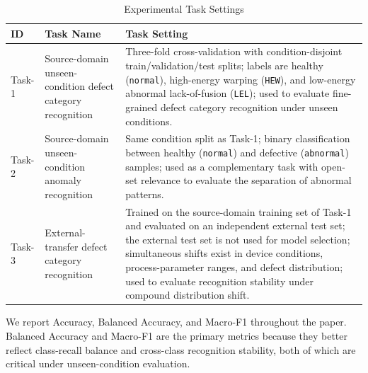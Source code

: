 \documentclass[journal]{IEEEtran}
\begin{document}
\begin{table}[!t]
\centering
\caption{Experimental Task Settings}
\label{tab:task_setup}
\footnotesize
\setlength{\tabcolsep}{4pt}
\begin{tabular*}{\textwidth}{@{\extracolsep{\fill}}>{\raggedright\arraybackslash}p{}>{\raggedright\arraybackslash}p{}>{\raggedright\arraybackslash}p{}@{}}
\toprule
ID & Task Name & Task Setting \\
\midrule
Task-1 & Source-domain unseen-condition defect category recognition & Three-fold cross-validation with condition-disjoint train/validation/test splits; labels are healthy (\texttt{normal}), high-energy warping (\texttt{HEW}), and low-energy abnormal lack-of-fusion (\texttt{LEL}); used to evaluate fine-grained defect category recognition under unseen conditions. \\
Task-2 & Source-domain unseen-condition anomaly recognition & Same condition split as Task-1; binary classification between healthy (\texttt{normal}) and defective (\texttt{abnormal}) samples; used as a complementary task with open-set relevance to evaluate the separation of abnormal patterns. \\
Task-3 & External-transfer defect category recognition & Trained on the source-domain training set of Task-1 and evaluated on an independent external test set; the external test set is not used for model selection; simultaneous shifts exist in device conditions, process-parameter ranges, and defect distribution; used to evaluate recognition stability under compound distribution shift. \\
\bottomrule
\end{tabular*}
\end{table}

We report Accuracy, Balanced Accuracy, and Macro-F1 throughout the paper. Balanced Accuracy and Macro-F1 are the primary metrics because they better reflect class-recall balance and cross-class recognition stability, both of which are critical under unseen-condition evaluation.
\end{document}
